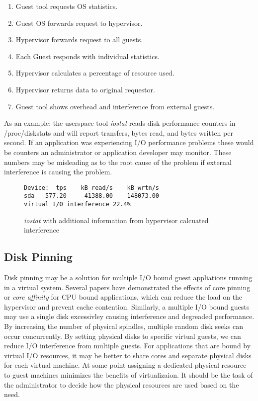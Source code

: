 \begin{enumerate}
	\item Guest tool requests OS statistics.
	\item Guest OS forwards request to hypervisor.
	\item Hypervisor forwards request to all guests.
	\item Each Guest responds with individual statistics.
	\item Hypervisor calculates a percentage of resource used.
	\item Hypervisor returns data to original requestor.
	\item Guest tool shows overhead and interference from external guests.
\end{enumerate}

As an example: the userspace tool \emph{iostat} reads disk performance counters in /proc/diskstats and will report transfers, bytes read, and bytes written per second.  If an application was experiencing I/O performance problems these would be counters an administrator or application developer may monitor.  These numbers may be misleading as to the root cause of the problem if external interference is causing the problem.  
\begin{figure}
\begin{Verbatim}
Device:  tps    kB_read/s    kB_wrtn/s
sda   577.20     41388.00    148073.00
virtual I/O interference 22.4%     
\end{Verbatim}
\label{fig:iostat}
\caption{\emph{iostat} with additional information from hypervisor calcuated interference}
\end{figure}

\subsection{Disk Pinning}
Disk pinning may be a solution for multiple I/O bound guest appliations running in a virtual system.  Several papers have demonstrated the effects of core pinning or \emph{core affinity} for CPU bound applications, which can reduce the load on the hypervisor and prevent cache contention.  Similarly, a multiple I/O bound guests may use a single disk excessivley causing interference and degreaded performance.  By increasing the number of physical spindles, multiple random disk seeks can occur concurrently.  By setting physical disks to specific virtual guests, we can reduce I/O interference from multiple guests.  For applications that are bound by virtual I/O resources, it may be better to share cores and separate physical disks for each virtual machine.  At some point assigning a dedicated physical resource to guest machines minimizes the benefits of virtualizaion.  It should be the task of the administrator to decide how the physical resources are used based on the need.
